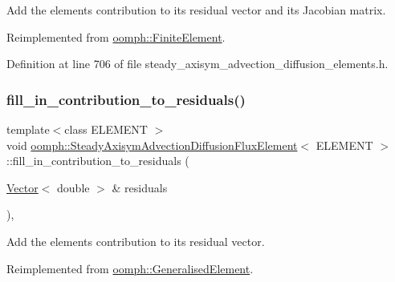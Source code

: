 Add the element\textquotesingle{}s contribution to its residual vector and its Jacobian matrix. 



Reimplemented from \hyperlink{classoomph_1_1FiniteElement_a0ae7af222af38a0d53bf283dc85bdfea}{oomph\+::\+Finite\+Element}.



Definition at line 706 of file steady\+\_\+axisym\+\_\+advection\+\_\+diffusion\+\_\+elements.\+h.

\mbox{\label{classoomph_1_1SteadyAxisymAdvectionDiffusionFluxElement_a8c35ea7bd3a41ea52cd8ed35268aaa35}} 
\subsubsection{\texorpdfstring{fill\+\_\+in\+\_\+contribution\+\_\+to\+\_\+residuals()}{fill\_in\_contribution\_to\_residuals()}}
{\footnotesize\ttfamily template$<$class E\+L\+E\+M\+E\+NT $>$ \\
void \hyperlink{classoomph_1_1SteadyAxisymAdvectionDiffusionFluxElement}{oomph\+::\+Steady\+Axisym\+Advection\+Diffusion\+Flux\+Element}$<$ E\+L\+E\+M\+E\+NT $>$\+::fill\+\_\+in\+\_\+contribution\+\_\+to\+\_\+residuals (\begin{DoxyParamCaption}\item[{\hyperlink{classoomph_1_1Vector}{Vector}$<$ double $>$ \&}]{residuals }\end{DoxyParamCaption})\hspace{0.3cm}{\ttfamily [inline]}, {\ttfamily [virtual]}}



Add the element\textquotesingle{}s contribution to its residual vector. 



Reimplemented from \hyperlink{classoomph_1_1GeneralisedElement_a310c97f515e8504a48179c0e72c550d7}{oomph\+::\+Generalised\+Element}.



